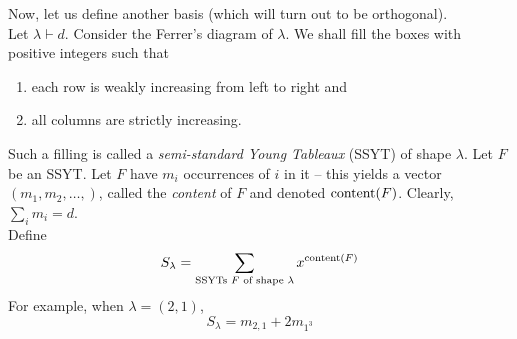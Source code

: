 	Now, let us define another basis (which will turn out to be orthogonal).\\

	Let $\lambda \vdash d$. Consider the Ferrer's diagram of $\lambda$. We shall fill the boxes with positive integers such that
	\begin{enumerate}
		\item each row is weakly increasing from left to right and
		\item all columns are strictly increasing.
	\end{enumerate}
	Such a filling is called a \emph{semi-standard Young Tableaux} (SSYT) of shape $\lambda$. Let $F$ be an SSYT. Let $F$ have $m_i$ occurrences of $i$ in it -- this yields a vector $(m_1,m_2,\ldots,)$, called the \emph{content} of $F$ and denoted $\operatorname{content}(F)$. Clearly, $\sum_i m_i = d$.\\
	Define
	\[ S_\lambda = \sum_{\text{SSYTs $F$ of shape $\lambda$}} x^{\operatorname{content}(F)} \]
	For example, when $\lambda = (2,1)$,
	\[ S_\lambda = m_{2,1} + 2 m_{1^3} \]

